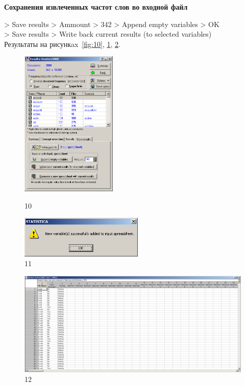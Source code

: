 \begin{center}
  \textbf{Сохранения извлеченных частот слов во входной файл}
\end{center}

> Save results > Ammount > 342 > Append empty variables > OK \\
> Save results > Write back current results (to selected variables) \\

Результаты на рисункax~\ref{fig:10}, \ref{fig:11}, \ref{fig:12}.

\begin{figure}[!h]
  \centering

  \begin{minipage}{0.49\textwidth}
    \centering

    \includegraphics[height=7cm]
    {inc/10.PNG}

    \caption{10}

    \label{fig:10}
  \end{minipage}
  \begin{minipage}{0.49\textwidth}
    \centering

    \includegraphics[height=2cm]
    {inc/11.PNG}

    \caption{11}

    \label{fig:11}
  \end{minipage}
\end{figure}

\begin{figure}[p!h]
  \centering

  \includegraphics[width=17cm]
  {inc/12.PNG}

  \caption{12}

  \label{fig:12}
\end{figure}

